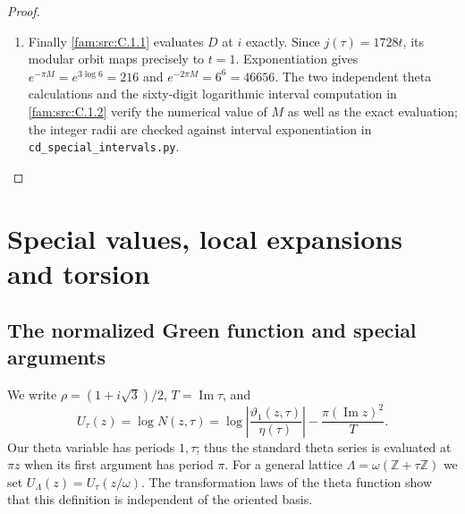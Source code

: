 \begin{proof}
\begin{enumerate}[label=\arabic*.,leftmargin=*]
\item Finally \ref{fam:src:C.1.1} evaluates $D$ at $i$ exactly. Since $j(\tau)=1728t$, its
modular orbit maps precisely to $t=1$. Exponentiation gives
$e^{-\pi M}=e^{3\log6}=216$ and $e^{-2\pi M}=6^6=46656$.
The two independent theta calculations and the sixty-digit logarithmic
interval computation in \ref{fam:src:C.1.2} verify the numerical value of $M$ as well
as the exact evaluation; the integer radii are checked against interval
exponentiation in \texttt{cd\_special\_intervals.py}.
\end{enumerate}
\end{proof}


\section{Special values, local expansions and torsion}
\subsection{The normalized Green function and special arguments}
We write $\rho=(1+i\sqrt3)/2$, $T=\operatorname{Im}\tau$, and
\[
 U_\tau(z)=\log N(z,\tau)
 =\log\left|\frac{\vartheta _1(z,\tau)}{\eta(\tau)}\right|
       -\frac{\pi(\operatorname{Im}z)^2}{T}.
\]
Our theta variable has periods $1,\tau$; thus the standard theta series
is evaluated at $\pi z$ when its first argument has period $\pi$.
For a general lattice $\Lambda=\omega(\mathbb Z+\tau\mathbb Z)$ we set
$U_\Lambda(z)=U_\tau(z/\omega)$. The transformation laws of the theta
function show that this definition is independent of the oriented basis.

